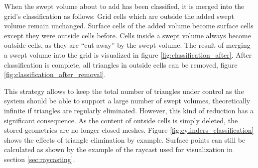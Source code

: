 When the swept volume about to add has been classified, it is merged into the grid's classification as follows:
Grid cells which are outside the added swept volume remain unchanged.
Surface cells of the added volume become surface cells except they were outside cells before.
Cells inside a swept volume always become outside cells, as they are \enquote{cut away} by the swept volume.
The result of merging a swept volume into the grid is visualized in figure \ref{fig:classification_after}.
After classification is complete, all triangles in outside cells can be removed, \cf figure \ref{fig:classification_after_removal}.

This strategy allows to keep the total number of triangles under control as the system should be able to support a large number of swept volumes, theoretically infinite if triangles are regularly eliminated.
%
However, this kind of reduction has a significant consequence.
As the content of outside cells is simply deleted, the stored geometries are no longer closed meshes.
Figure \ref{fig:cylinders_classification} shows the effects of triangle elimination by example.
Surface points can still be calculated as shown by the example of the raycast used for visualization in section \ref{sec:raycasting}.

